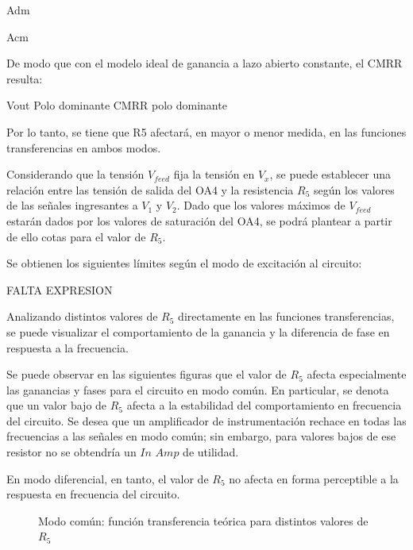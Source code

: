 Adm

Acm

De modo que con el modelo ideal de ganancia a lazo abierto constante, el CMRR resulta:

Vout Polo dominante
CMRR polo dominante


Por lo tanto, se tiene que R5 afectará, en mayor o menor medida, en las funciones transferencias en ambos modos.

Considerando que la tensión $V_{feed}$ fija la tensión en $V_{x}$, se puede establecer una relación entre las tensión de salida del OA4 y la resistencia $R_{5}$ según los valores de las señales ingresantes a 
$V_{1}$ y $V_{2}$. Dado que los valores máximos de $V_{feed}$ estarán dados por los valores de saturación del OA4, se podrá plantear a partir de ello cotas para el valor de $R_{5}$. 

Se obtienen los siguientes límites según el modo de excitación al circuito:

FALTA EXPRESION


Analizando distintos valores de $R_{5}$ directamente en las funciones transferencias, se puede visualizar el comportamiento de la ganancia y la diferencia de fase en respuesta a la frecuencia. 

Se puede observar en las siguientes figuras que el valor de $R_{5}$ afecta especialmente las ganancias y fases para el circuito en modo común. En particular, 
se denota que un valor bajo de $R_{5}$ afecta a la estabilidad del comportamiento en frecuencia del circuito. Se desea que un amplificador de instrumentación rechace en todas las frecuencias a las señales 
en modo común; sin embargo, para valores bajos de ese resistor no se obtendría un $In$ $Amp$ de utilidad. 

En modo diferencial, en tanto, el valor de $R_{5}$ no afecta en forma perceptible a la respuesta en frecuencia del circuito. 

\begin{figure}[H]
    \centering
    \hfill
    \caption{Modo común: función transferencia teórica para distintos valores de $R_{5}$}
    \label{fig:R5MC}
  \end{figure}
  
